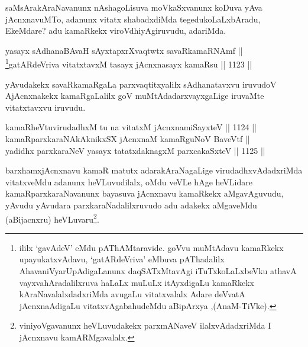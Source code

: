 \begin{artha}
saMsArakAraNavanunx nAshagoLisuva moVkaSxvanunx koDuva yAva jAcnxnavuMTo, adanunx vitatx shabadxdiMda tegedukoLaLxbAradu, EkeMdare? adu kamaRkekx viroVdhiyAgiruvudu, adariMda.
\end{artha}


\begin{shl}
yasayx sAdhanaBAvaH sAyxtapxrXvaqtwtx savaRkamaRNAmf || \\
\footnote{ililx `gavAdeV' eMdu pAThAMtaravide. goVvu muMtAdavu kamaRkekx upayukatxvAdavu, `gatARdeVriva' eMbuva pAThadalilx AhavaniVyarUpAdigaLanunx daqSATxMtavAgi iTuTxkoLaLxbeVku athavA vayxvahAradalilxruva haLaLx muLuLx itAyxdigaLu kamaRkekx kAraNavalalxdadxriMda avugaLu vitatxvalalx Adare deVvatA jAcnxnaAdigaLu vitatxvAgabahudeMdu aBipArxya ,(AnaM-TiVke).}gatARdeVriva vitatxtavxM tasayx jAcnxnasayx kamaRsu \hfill || 1123 ||  
\end{shl}


\begin{artha}
yAvudakekx savaRkamaRgaLa parxvaqtitxyalilx sAdhanatavxvu iruvudoV AjAcnxnakekx kamaRgaLalilx goV muMtAdadarxvayxgaLige iruvaMte vitatxtavxvu iruvudu.
\end{artha}


\begin{shl}
kamaRheVtuvirudadhxM tu na vitatxM jAcnxnamiSayxteV \hfill || 1124 ||  \\
kamaRparxkaraNAkAknikxSX jAcnxnaM kamaRguNoV BaveVtf || \\
yadidhx parxkaraNeV yasayx tatatxdaknagxM parxcakaSxteV \hfill || 1125 || 
\end{shl}

\begin{artha}
barxhamxjAcnxnavu kamaR matutx adarakAraNagaLige virudadhxvAdadxriMda vitatxveMdu adanunx heVLuvudilalx, oMdu veVLe hAge heVLidare kamaRparxkaraNavanunx bayasuva jAcnxnavu kamaRkekx aMgavAguvudu, yAvudu yAvudara parxkaraNadalilxruvudo adu adakekx aMgaveMdu (aBijacnxru) heVLuvaru\footnote{viniyoVgavanunx heVLuvudakekx parxmANaveV ilalxvAdadxriMda I jAcnxnavu kamARMgavalalx.}.
\end{artha}


